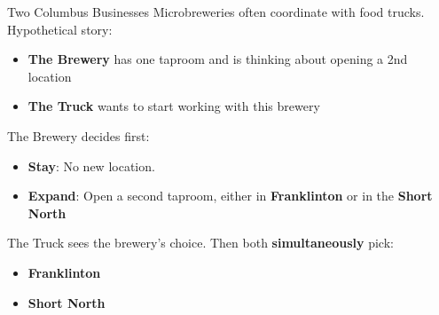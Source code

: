 
\begin{frame}{Two Columbus Businesses}
Microbreweries often coordinate with food trucks.\\
Hypothetical story:
\bsk
\begin{itemize}
    \item \textbf{The Brewery} has one taproom and is thinking about opening a 2nd location
    \item \textbf{The Truck} wants to start working with this brewery
\end{itemize}
\bsk
The Brewery decides first:
\begin{itemize}
    \item \textbf{Stay}: No new location.
    \item \textbf{Expand}: Open a second taproom, either in
      \textbf{Franklinton} or in the \textbf{Short North}
\end{itemize}
The Truck sees the brewery's choice. Then both \textbf{simultaneously} pick:
\begin{itemize}
    \item \textbf{Franklinton}
    \item \textbf{Short North}
\end{itemize}
\end{frame}

